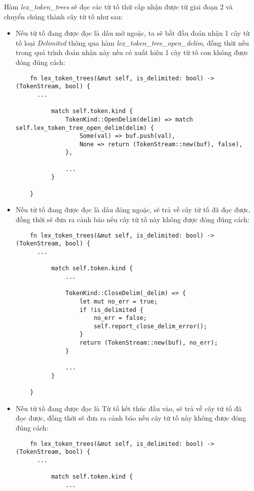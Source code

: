 Hàm \textit{lex\_token\_trees} sẽ đọc các từ tố thứ cấp nhận được từ giai đoạn 2 và chuyển chúng thành cây từ tố như sau:

\begin{itemize}
  \item Nếu từ tố đang được đọc là dấu mở ngoặc, ta sẽ bắt đầu đoán nhận 1 cây từ tố loại \textit{Delimited} thông qua hàm \textit{lex\_token\_tree\_open\_delim}, đồng thời nếu trong quá trình đoán nhận này nếu có xuất hiện 1 cây từ tố con không được đóng đúng cách:
  \begin{lstlisting}
    fn lex_token_trees(&mut self, is_delimited: bool) -> (TokenStream, bool) {
      ...
  
          match self.token.kind {
              TokenKind::OpenDelim(delim) => match self.lex_token_tree_open_delim(delim) {
                  Some(val) => buf.push(val),
                  None => return (TokenStream::new(buf), false),
              },
              
              ...
          }
  
    }
  \end{lstlisting}
  \item Nếu từ tố đang được đọc là dấu đóng ngoặc, sẽ trả về cây từ tố đã đọc được, đồng thời sẽ đưa ra cảnh báo nếu cây từ tố này không được đóng đúng cách:
  \begin{lstlisting}
    fn lex_token_trees(&mut self, is_delimited: bool) -> (TokenStream, bool) {
      ...
  
          match self.token.kind {
              ...
              
              TokenKind::CloseDelim(_delim) => {
                  let mut no_err = true;
                  if !is_delimited {
                      no_err = false;
                      self.report_close_delim_error();
                  }
                  return (TokenStream::new(buf), no_err);
              }
              
              ...
          }
  
    }
  \end{lstlisting}
  \item Nếu từ tố đang được đọc là Từ tố kết thúc đầu vào, sẽ trả về cây từ tố đã đọc được, đồng thời sẽ đưa ra cảnh báo nếu cây từ tố này không được đóng đúng cách:
  \begin{lstlisting}
    fn lex_token_trees(&mut self, is_delimited: bool) -> (TokenStream, bool) {
      ...
  
          match self.token.kind {
              ...


\end{lstlisting}
\end{itemize}
